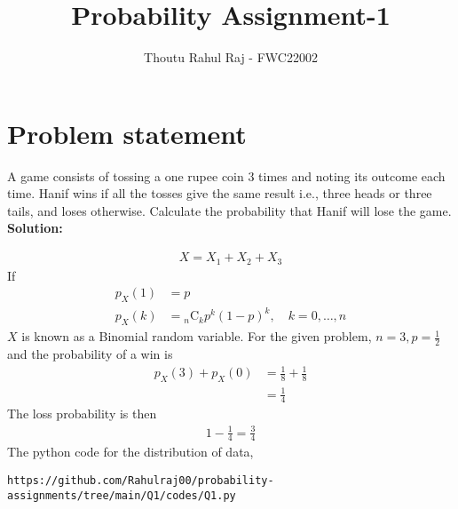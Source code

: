 \documentclass{article}
\newcommand{\comb}[2]{{}_{#1}\mathrm{C}_{#2}}
\newcommand{\solution}{\noindent \textbf{Solution: }}
\begin{document}
\newcommand{\BEQA}{\begin{eqnarray}}
\newcommand{\EEQA}{\end{eqnarray}}
\newcommand{\define}{\stackrel{\triangle}{=}}

\raggedbottom
\setlength{\parindent}{0pt}
\providecommand{\mbf}{\mathbf}
\providecommand{\pr}[1]{\ensuremath{\Pr\left(#1\right)}}
\providecommand{\qfunc}[1]{\ensuremath{Q\left(#1\right)}}
\providecommand{\sbrak}[1]{\ensuremath{{}\left[#1\right]}}
\providecommand{\lsbrak}[1]{\ensuremath{{}\left[#1\right.}}
\providecommand{\rsbrak}[1]{\ensuremath{{}\left.#1\right]}}
\providecommand{\brak}[1]{\ensuremath{\left(#1\right)}}
\providecommand{\lbrak}[1]{\ensuremath{\left(#1\right.}}
\providecommand{\rbrak}[1]{\ensuremath{\left.#1\right)}}
\providecommand{\cbrak}[1]{\ensuremath{\left\{#1\right\}}}
\providecommand{\lcbrak}[1]{\ensuremath{\left\{#1\right.}}
\providecommand{\rcbrak}[1]{\ensuremath{\left.#1\right\}}}
\theoremstyle{remark}
\title{Probability Assignment-1}
\author{\Large Thoutu Rahul Raj - FWC22002}
\date{}
\maketitle
\setcounter{enumi}{3}
\setcounter{enumii}{6}
\section*{\large Problem statement}
A game consists of tossing a one rupee coin 3 times and noting its outcome each time. Hanif wins if all the tosses give the same result i.e., three heads or three tails, and loses otherwise. Calculate the probability that Hanif will lose the game.\\

\solution
\begin{table}[h]

\end{table}

\begin{align}
X = X_1+X_2+X_3	
\end{align}
If 
\begin{align}
p_X(1) &= p\\
p_X(k) &= \comb{n}{k}p^k\brak{1-p}^k, \quad k = 0,\dots, n
\end{align}
$X$ is known as a Binomial random variable.  For the given problem, $n = 3, p = \frac{1}{2}$ and the probability of a win is 
\begin{align}
p_X(3) + p_X(0) &= \frac{1}{8}+\frac{1}{8}
\\
&= \frac{1}{4}
\end{align}
The loss probability is then
\begin{align}
1-\frac{1}{4} = \frac{3}{4}
\end{align}
The python code for the distribution of data,\\
\begin{lstlisting}
https://github.com/Rahulraj00/probability-assignments/tree/main/Q1/codes/Q1.py 
\end{lstlisting}   	
\end{document}
